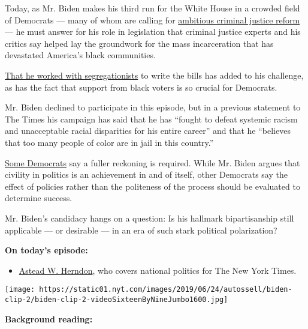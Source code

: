 Today, as Mr. Biden makes his third run for the White House in a crowded
field of Democrats --- many of whom are calling for
\href{https://www.nytimes.com/2019/06/20/us/politics/booker-drugs-clemency.html}{ambitious
criminal justice reform} --- he must answer for his role in legislation
that criminal justice experts and his critics say helped lay the
groundwork for the mass incarceration that has devastated America's
black communities.

\href{https://www.nytimes.com/2019/06/21/us/politics/joe-biden-james-eastland.html?rref=collection\%2Fbyline\%2Flinda-qiu\&action=click\&contentCollection=undefined\&region=stream\&module=stream_unit\&version=latest\&contentPlacement=1\&pgtype=collection}{That
he worked with segregationists} to write the bills has added to his
challenge, as has the fact that support from black voters is so crucial
for Democrats.

Mr. Biden declined to participate in this episode, but in a previous
statement to The Times his campaign has said that he has ``fought to
defeat systemic racism and unacceptable racial disparities for his
entire career'' and that he ``believes that too many people of color are
in jail in this country.''

\href{https://www.nytimes.com/2019/07/31/us/politics/kamala-harris-biden-busing.html}{Some
Democrats} say a fuller reckoning is required. While Mr. Biden argues
that civility in politics is an achievement in and of itself, other
Democrats say the effect of policies rather than the politeness of the
process should be evaluated to determine success.

Mr. Biden's candidacy hangs on a question: Is his hallmark
bipartisanship still applicable --- or desirable --- in an era of such
stark political polarization?

\textbf{On today's episode:}

\begin{itemize}
\tightlist
\item
  \href{https://www.nytimes.com/by/astead-w-herndon}{Astead W. Herndon},
  who covers national politics for The New York Times.
\end{itemize}

\texttt{[image: https://static01.nyt.com/images/2019/06/24/autossell/biden-clip-2/biden-clip-2-videoSixteenByNineJumbo1600.jpg]}

\textbf{Background reading:}

